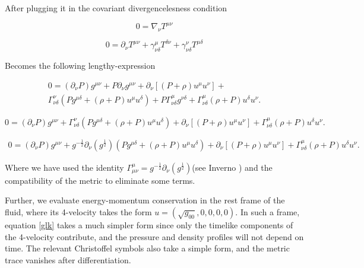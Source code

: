 After plugging it in the covariant divergencelesness condition 

\begin{equation}
0 = \nabla_\nu T^{\mu \nu}
\end{equation}

\begin{equation}
0 =  \partial_\nu T^{\mu \nu} + \gamma^\mu_{\nu \delta} T^{\delta \nu} + \gamma^\nu_{\nu \delta} T^{\mu \delta}
\end{equation}

Becomes the following lengthy-expression

\begin{equation}
\begin{matrix}
0 = (\partial_\nu P) g^{\mu \nu} + P \partial_\nu g^{\mu \nu} +\partial_\nu \left[ (P+\rho) u^\mu u^\nu \right]+ \\ \Gamma^\nu_{\nu \delta}(P g^{\mu \delta} + (\rho+P)u^\mu u^\delta ) + P \Gamma^\mu_{\nu \delta} g^{\nu \delta} +\Gamma^\mu_{\nu \delta} (\rho+ P) u^\delta u^\nu.
\end{matrix}
\end{equation}

\begin{equation}
0 = (\partial_\nu P) g^{\mu \nu} + \Gamma^\nu_{\nu \delta}(P g^{\mu \delta} + (\rho+P)u^\mu u^\delta ) + \partial_\nu \left[ (P+\rho) u^\mu u^\nu \right]+ \Gamma^\mu_{\nu \delta} (\rho+ P) u^\delta u^\nu.
\end{equation}

\begin{equation}\label{glk}
\begin{matrix}
0 = (\partial_\nu P) g^{\mu \nu} + g^{-\frac{1}{2}}\partial_\nu(g^{\frac{1}{2}})  (P g^{\mu \delta} + (\rho+P)u^\mu u^\delta ) + \partial_\nu \left[ (P+\rho) u^\mu u^\nu \right]+ \Gamma^\mu_{\nu \delta} (\rho+ P) u^\delta u^\nu.
\end{matrix}
\end{equation}

Where we have used the identity $\Gamma^\mu_{\mu \nu}=g^{-\frac{1}{2}}\partial_\nu(g^{\frac{1}{2}})$(see Inverno \cite[chapter 7]{inverno}) and the compatibility of the metric to eliminate some terms. 

Further, we evaluate energy-momentum conservation in the rest frame of the fluid, where its 4-velocity takes the form $u=(\sqrt{g_{00}},0,0,0,0)$. In such a frame, equation \ref{glk} takes a much simpler form since only the timelike components of the 4-velocity contribute, and the pressure and density profiles will not depend on time. The relevant Christoffel symbols also take a simple form, and the metric trace vanishes after differentiation. 

